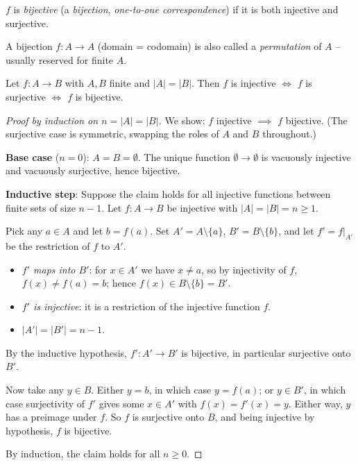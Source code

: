 \documentclass[11pt]{article}
\begin{document}
\begin{definition}[Bijective]
$f$ is \emph{bijective} (a \emph{bijection}, \emph{one-to-one correspondence}) if it is both injective and surjective.
\end{definition}

\begin{note}[Permutation]
A bijection $f: A \to A$ (domain = codomain) is also called a \emph{permutation} of $A$ -- usually reserved for finite $A$.
\end{note}

\begin{theorem}
Let $f: A \to B$ with $A, B$ finite and $|A| = |B|$. Then $f$ is injective $\iff$ $f$ is surjective $\iff$ $f$ is bijective.
\end{theorem}
\begin{proof}[Proof by induction on $n = |A| = |B|$]
We show: $f$ injective $\implies$ $f$ bijective. (The surjective case is symmetric, swapping the roles of $A$ and $B$ throughout.)

\textbf{Base case} ($n=0$): $A = B = \emptyset$. The unique function $\emptyset \to \emptyset$ is vacuously injective and vacuously surjective, hence bijective.

\textbf{Inductive step}: Suppose the claim holds for all injective functions between finite sets of size $n-1$. Let $f: A \to B$ be injective with $|A| = |B| = n \ge 1$.

Pick any $a \in A$ and let $b = f(a)$. Set $A' = A \setminus \{a\}$, $B' = B \setminus \{b\}$, and let $f' = f|_{A'}$ be the restriction of $f$ to $A'$.

\begin{itemize}
    \item \emph{$f'$ maps into $B'$}: for $x \in A'$ we have $x \neq a$, so by injectivity of $f$, $f(x) \neq f(a) = b$; hence $f(x) \in B \setminus \{b\} = B'$.
    \item \emph{$f'$ is injective}: it is a restriction of the injective function $f$.
    \item $|A'| = |B'| = n-1$.
\end{itemize}

By the inductive hypothesis, $f' : A' \to B'$ is bijective, in particular surjective onto $B'$.

Now take any $y \in B$. Either $y = b$, in which case $y = f(a)$; or $y \in B'$, in which case surjectivity of $f'$ gives some $x \in A'$ with $f(x) = f'(x) = y$. Either way, $y$ has a preimage under $f$. So $f$ is surjective onto $B$, and being injective by hypothesis, $f$ is bijective.

By induction, the claim holds for all $n \ge 0$.
\end{proof}
\end{document}
